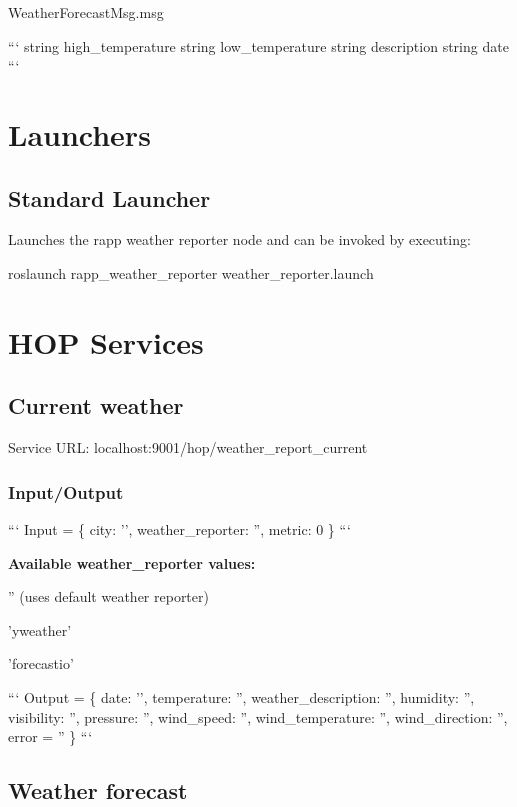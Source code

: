 Weather\-Forecast\-Msg.\-msg

``` string high\-\_\-temperature string low\-\_\-temperature string description string date ```

\section*{Launchers}

\subsection*{Standard Launcher}

Launches the rapp weather reporter node and can be invoked by executing\-:

{\ttfamily roslaunch rapp\-\_\-weather\-\_\-reporter weather\-\_\-reporter.\-launch}

\section*{H\-O\-P Services}

\subsection*{Current weather}

Service U\-R\-L\-: {\ttfamily localhost\-:9001/hop/weather\-\_\-report\-\_\-current}

\subsubsection*{Input/\-Output}

``` Input = \{ city\-: '', weather\-\_\-reporter\-: '', metric\-: 0 \} ```

{\bfseries Available weather\-\_\-reporter values\-:}
\begin{DoxyItemize}
\item '' (uses default weather reporter)
\item 'yweather'
\item 'forecastio'
\end{DoxyItemize}

``` Output = \{ date\-: '', temperature\-: '', weather\-\_\-description\-: '', humidity\-: '', visibility\-: '', pressure\-: '', wind\-\_\-speed\-: '', wind\-\_\-temperature\-: '', wind\-\_\-direction\-: '', error = '' \} ```

\subsection*{Weather forecast}

